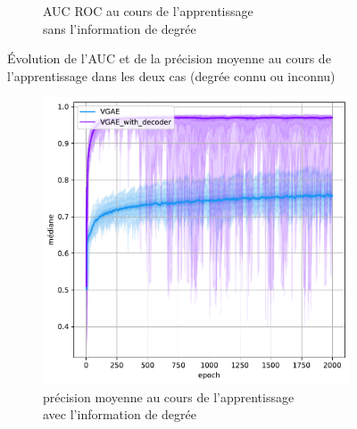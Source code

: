 \documentclass{article}
\begin{document}
\begin{figure}[H]
\begin{subfigure}{0.45\textwidth}
      \centering
      \caption{AUC ROC au cours de l'apprentissage\\ sans l'information de degrée}
    \end{subfigure}
    \caption{Évolution de l'AUC et de la précision moyenne au cours de l'apprentissage dans les deux cas (degrée connu ou inconnu)}
    \label{fig:dropout}
\end{figure}
\begin{figure}[H]
    \centering
    \captionsetup{justification=centering}
    \begin{subfigure}{0.45\textwidth}
      \includegraphics[width=\textwidth]{graphics/APs_degree_decoder_cinf.svg.pdf}
      \centering
      \caption{précision moyenne au cours de l'apprentissage\\ avec l'information de degrée}
    \end{subfigure}
    \begin{subfigure}{0.45\textwidth}

\end{subfigure}
\end{figure}
\end{document}
